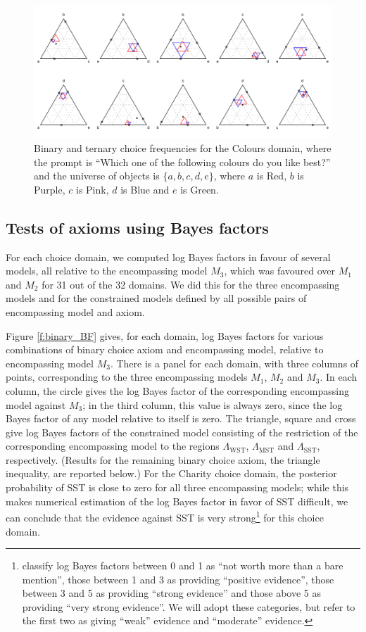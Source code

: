 \documentclass[11pt,letter]{article}
\begin{document}
\begin{figure}
	\caption{Binary and ternary choice frequencies for the Colours domain, where the prompt is ``Which one of the following colours do you like best?'' and the universe of objects is $\{a,b,c,d,e\}$, where $a$ is Red, $b$ is Purple, $c$ is Pink, $d$ is Blue and $e$ is Green.}\label{f:colours}
	\centering
	\includegraphics[width=16cm]{./Population_study_data/Simplexes/Colours.pdf}
\end{figure}

\subsection{Tests of axioms using Bayes factors}

For each choice domain, we computed log Bayes factors in favour of several models, all relative to the encompassing model $M_3$, which was favoured over $M_1$ and $M_2$ for 31 out of the 32 domains.
We did this for the three encompassing models and for the constrained models defined by all possible pairs of encompassing model and axiom.

Figure \ref{f:binary_BF} gives, for each domain, log Bayes factors for various combinations of binary choice axiom and encompassing model, relative to encompassing model $M_3$.
There is a panel for each domain, with three columns of points, corresponding to the three encompassing models $M_1$, $M_2$ and $M_3$.
In each column, the circle gives the log Bayes factor of the corresponding encompassing model against $M_3$; in the third column, this value is always zero, since the log Bayes factor of any model relative to itself is zero.
The triangle, square and cross give log Bayes factors of the constrained model consisting of the restriction of the corresponding encompassing model to the regions $\Lambda_{\mathrm{WST}}$, $\Lambda_{\mathrm{MST}}$ and $\Lambda_{\mathrm{SST}}$, respectively.
(Results for the remaining binary choice axiom, the triangle inequality, are reported below.)
For the Charity choice domain, the posterior probability of SST is close to zero for all three encompassing models; while this makes numerical estimation of the log Bayes factor in favor of SST difficult, we can conclude that the evidence against SST is very strong\footnote{ classify log Bayes factors between 0 and 1 as ``not worth more than a bare mention'', those between 1 and 3 as providing ``positive evidence'', those between 3 and 5 as providing ``strong evidence'' and those above 5 as providing ``very strong evidence''. We will adopt these categories, but refer to the first two as giving ``weak'' evidence and ``moderate'' evidence.} for this choice domain.
\end{document}
